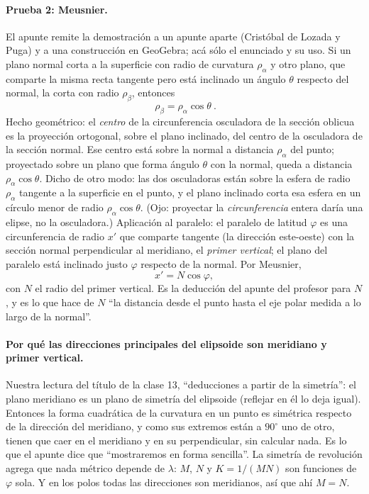 \paragraph{Prueba 2: Meusnier.} El apunte remite la demostración a un apunte aparte
(Cristóbal de Lozada y Puga) y a una construcción en GeoGebra; acá sólo el enunciado y su
uso. Si un plano normal corta a la superficie con radio de curvatura \(\rho_\alpha\) y otro
plano, que comparte la misma recta tangente pero está inclinado un ángulo \(\theta\)
respecto del normal, la corta con radio \(\rho_\beta\), entonces
\[
  \boxed{\ \rho_\beta=\rho_\alpha\cos\theta\ }.
\]
Hecho geométrico: el \emph{centro} de la circunferencia osculadora de la sección oblicua
es la proyección ortogonal, sobre el plano inclinado, del centro de la osculadora de la
sección normal. Ese centro está sobre la normal a distancia \(\rho_\alpha\) del punto;
proyectado sobre un plano que forma ángulo \(\theta\) con la normal, queda a distancia
\(\rho_\alpha\cos\theta\). Dicho de otro modo: las dos osculadoras están sobre la esfera
de radio \(\rho_\alpha\) tangente a la superficie en el punto, y el plano inclinado corta
esa esfera en un círculo menor de radio \(\rho_\alpha\cos\theta\). (Ojo: proyectar la
\emph{circunferencia} entera daría una elipse, no la osculadora.) Aplicación al paralelo: el paralelo de latitud \(\varphi\) es una
circunferencia de radio \(x'\) que comparte tangente (la dirección este-oeste) con la
sección normal perpendicular al meridiano, el \emph{primer vertical}; el plano del
paralelo está inclinado justo \(\varphi\) respecto de la normal. Por Meusnier,
\[
  x'=N\cos\varphi ,
\]
con \(N\) el radio del primer vertical. Es la deducción del apunte del profesor para
\(N\), y es lo que hace de \(N\) ``la distancia desde el punto hasta el eje polar medida a
lo largo de la normal''.

\paragraph{Por qué las direcciones principales del elipsoide son meridiano y primer
vertical.} Nuestra lectura del título de la clase 13, ``deducciones a partir de la simetría'':
el plano meridiano es un plano de simetría del elipsoide (reflejar en él lo deja igual).
Entonces la forma cuadrática de la curvatura en un punto es simétrica respecto de la
dirección del meridiano, y como sus extremos están a \(90^\circ\) uno de otro, tienen que
caer en el meridiano y en su perpendicular, sin calcular nada. Es lo que el apunte dice que
``mostraremos en forma sencilla''. La simetría de revolución agrega que nada métrico
depende de \(\lambda\): \(M\), \(N\) y \(K=1/(MN)\) son funciones de \(\varphi\) sola. Y en
los polos todas las direcciones son meridianos, así que ahí \(M=N\).

